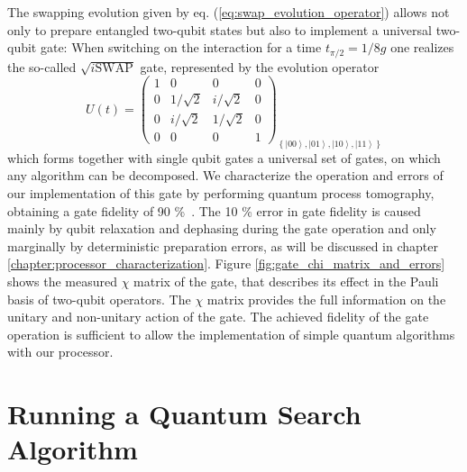 The swapping evolution given by eq. (\ref{eq:swap_evolution_operator})
allows not only to prepare entangled two-qubit states but also to
implement a universal two-qubit gate:
When switching on the interaction for a time $t_{\pi/2}=1/8g$ one
realizes the so-called $\sqrt{i\mathrm{SWAP}}$ gate, represented
by the evolution operator
%
\begin{equation}
U(t)=\left(\begin{array}{cccc}
1 & 0 & 0 & 0\\
0 & 1/\sqrt{2} & i/\sqrt{2} & 0\\
0 & i/\sqrt{2} & 1/\sqrt{2} & 0\\
0 & 0 & 0 & 1\end{array}\right)_{\left\{ \left|00\right\rangle ,\left|01\right\rangle ,\left|10\right\rangle ,\left|11\right\rangle \right\} } \label{eq:sqrt_iswap_gate}\end{equation}
%
which forms together with single qubit gates a universal set
of gates, on which any algorithm can be decomposed. We characterize
the operation and errors of our implementation of this gate by performing
quantum process tomography, obtaining a gate fidelity of 90 \%\ .
The 10 \% error in gate fidelity is caused mainly by qubit relaxation
and dephasing during the gate operation and only marginally by deterministic
preparation errors, as will be discussed in chapter \ref{chapter:processor_characterization}. Figure \ref{fig:gate_chi_matrix_and_errors}
shows the measured $\chi$ matrix of the gate, that describes its
effect in the Pauli basis of two-qubit operators. The $\chi$ matrix
provides the full information on the unitary and non-unitary action
of the gate. The achieved fidelity of the gate operation is sufficient
to allow the implementation of simple quantum algorithms with our
processor.


\section{Running a Quantum Search Algorithm}


